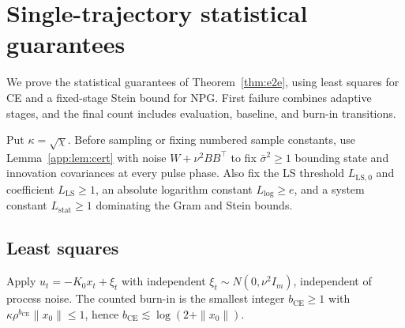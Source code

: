 \section{Single-trajectory statistical guarantees}\label{app:stat}

We prove the statistical guarantees of Theorem~\ref{thm:e2e}, using least
squares for CE and a fixed-stage Stein bound for NPG.
First failure combines adaptive stages, and the final count includes
evaluation, baseline, and burn-in transitions.

Put $\kappa=\sqrt{\chi}$. Before sampling or fixing numbered sample
constants, use Lemma~\ref{app:lem:cert} with noise $W+\nu^2BB^\top$
to fix $\bar\sigma^2\ge1$ bounding state and innovation covariances
at every pulse phase. Also fix the LS threshold $L_{\mathrm{LS},0}$
and coefficient $L_{\mathrm{LS}}\ge1$, an absolute logarithm constant
$L_{\log}\ge e$, and a system constant $L_{\mathrm{stat}}\ge1$ dominating
the Gram and Stein bounds.

\subsection{Least squares}\label{app:ls}

Apply $u_t=-K_0x_t+\xi_t$ with independent
$\xi_t\sim N(0,\nu^2I_m)$, independent of process noise.
The counted burn-in is the smallest integer $b_{\mathrm{CE}}\ge1$
with $\kappa\rho^{b_{\mathrm{CE}}}\|x_0\|\le1$, hence
$b_{\mathrm{CE}}\lesssim\log(2+\|x_0\|)$.

